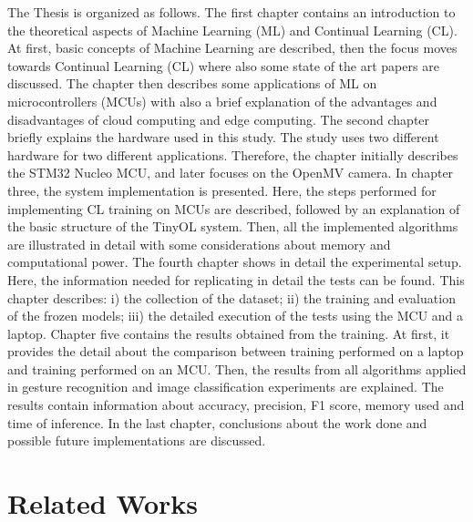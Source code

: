 \documentclass[12pt]{report}
\begin{document}
The Thesis is organized as follows. The first chapter contains an introduction to the theoretical aspects of Machine Learning (ML) and Continual Learning (CL). At first, basic concepts of Machine Learning are described, then the focus moves towards Continual Learning (CL) where also some state of the art papers are discussed. The chapter then describes some applications of ML on microcontrollers (MCUs) with also a brief explanation of the advantages and disadvantages of cloud computing and edge computing. The second chapter briefly explains the hardware used in this study. The study uses two different hardware for two different applications. Therefore, the chapter initially describes the STM32 Nucleo MCU, and later focuses on the OpenMV camera. In chapter three, the system implementation is presented. Here, the steps performed for implementing CL training on MCUs are described, followed by an explanation of the basic structure of the TinyOL system. Then, all the implemented algorithms are illustrated in detail with some considerations about memory and computational power. The fourth chapter shows in detail the experimental setup. Here, the information needed for replicating in detail the tests can be found. This chapter describes: i) the collection of the dataset; ii) the training and evaluation of the frozen models; iii) the detailed execution of the tests using the MCU and a laptop. Chapter five contains the results obtained from the training. At first, it provides the detail about the comparison between training performed on a laptop and training performed on an MCU. Then, the results from all algorithms applied in gesture recognition and image classification experiments are explained. The results contain information about accuracy, precision, F1 score, memory used and time of inference. In the last chapter, conclusions about the work done and possible future implementations are discussed.


\chapter{Related Works} \label{chap:relworks}
\end{document}

